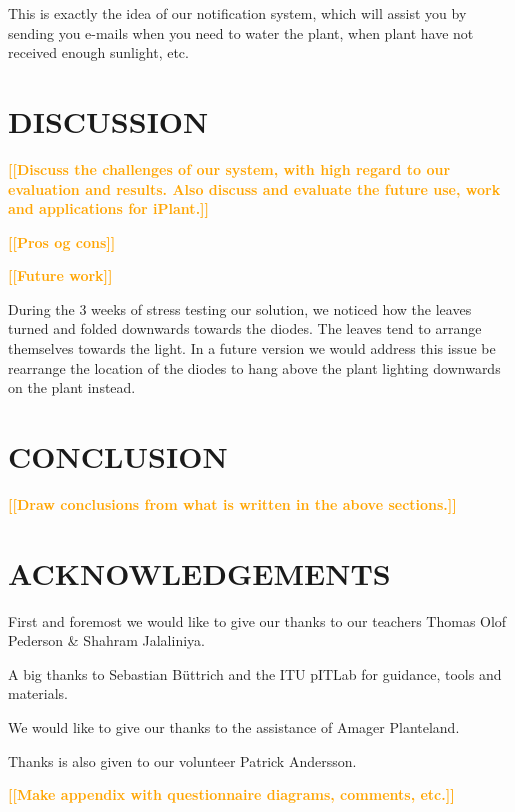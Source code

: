 \documentclass{ubicomp2012}
\newcommand{\todo}[1]{\textsf{\textbf{\textcolor{Orange}{[[#1]]}}}}
\begin{document}
This is exactly the idea of our notification system, which will assist you by sending you e-mails when you need to water the plant, when plant have not received enough sunlight, etc.

\section{DISCUSSION}
\todo{Discuss the challenges of our system, with high regard to our evaluation and results. Also discuss and evaluate the future use, work and applications for iPlant.}

\todo{Pros og cons}

\todo{Future work}

During the 3 weeks of stress testing our solution, we noticed how the leaves turned and folded downwards towards the diodes. The leaves tend to arrange themselves towards the light. In a future version we would address this issue be rearrange the location of the diodes to hang above the plant lighting downwards on the plant instead.

\section{CONCLUSION}
\todo{Draw conclusions from what is written in the above sections.}

\nocite{Smart-Homes-and-the-People-Who-Live-in-Them}
\section{ACKNOWLEDGEMENTS}
First and foremost we would like to give our thanks to our teachers Thomas Olof Pederson \& Shahram Jalaliniya.

A big thanks to Sebastian B\"uttrich and the ITU pITLab for guidance, tools and materials.

We would like to give our thanks to the assistance of Amager Planteland.

Thanks is also given to our volunteer Patrick Andersson.

\vfill\eject




\todo{Make appendix with questionnaire diagrams, comments, etc.}
\end{document}

